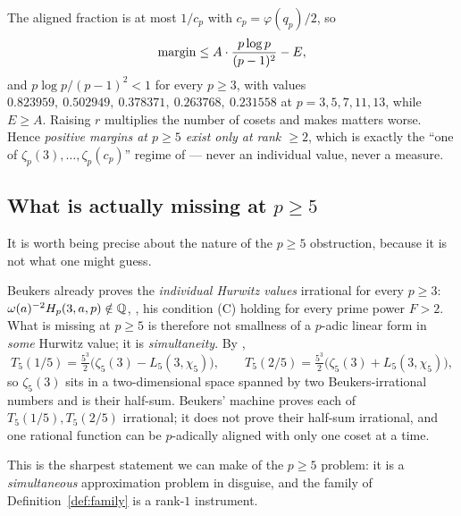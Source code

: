 \begin{corollary}\label{cor:noAhelp}
\DERIVED{} The aligned fraction is at most $1/c_p$ with $c_p=\varphi(q_p)/2$, so
\[
 \operatorname{margin}\le A\cdot\frac{p\log p}{(p-1)^2}-E,
\]
and $p\log p/(p-1)^2<1$ for every $p\ge3$, with values
$0.823959,\ 0.502949,\ 0.378371,\ 0.263768,\ 0.231558$ at $p=3,5,7,11,13$, while $E\ge A$.
Raising $r$ multiplies the number of cosets and makes matters worse. Hence \emph{positive
margins at $p\ge5$ exist only at rank $\ge2$}, which is exactly the ``one of
$\zeta_p(3),\dots,\zeta_p(c_p)$'' regime of \cite{LLS2025} --- never an individual
value, never a measure.
\end{corollary}

\subsection{What is actually missing at \texorpdfstring{$p\ge5$}{p>=5}}\label{ss:simultaneity}

It is worth being precise about the nature of the $p\ge5$ obstruction, because it is not
what one might guess.

\begin{remark}\label{rem:beukersirr}
Beukers already proves the \emph{individual Hurwitz values} irrational for every $p\ge3$:
$\omega(a)^{-2}H_p(3,a,p)\notin\mathbb{Q}$, \cite[Cor.~11.3]{Beukers2008}, his condition (C)
holding for every prime power $F>2$. What is missing at $p\ge5$ is therefore not smallness
of a $p$-adic linear form in \emph{some} Hurwitz value; it is \emph{simultaneity}. By
\cite[Prop.~5.2]{Beukers2008},
\[
 T_5(1/5)=\tfrac{5^3}2\bigl(\zeta_5(3)-L_5(3,\chi_5)\bigr),\qquad
 T_5(2/5)=\tfrac{5^3}2\bigl(\zeta_5(3)+L_5(3,\chi_5)\bigr),
\]
so $\zeta_5(3)$ sits in a two-dimensional space spanned by two Beukers-irrational numbers
and is their half-sum. Beukers' machine proves each of $T_5(1/5),T_5(2/5)$ irrational; it
does not prove their half-sum irrational, and one rational function can be $p$-adically
aligned with only one coset at a time.
\end{remark}

This is the sharpest statement we can make of the $p\ge5$ problem: it is a
\emph{simultaneous} approximation problem in disguise, and the family of
Definition~\ref{def:family} is a rank-$1$ instrument.
